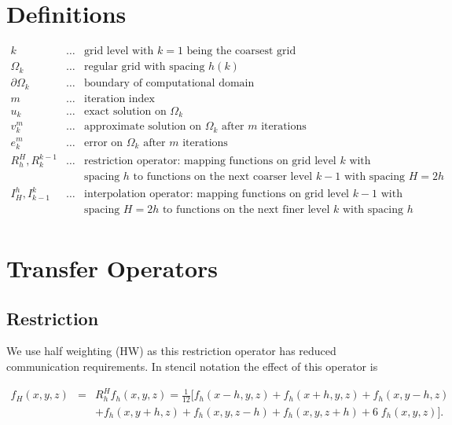 \documentclass[11pt, oneside, a4paper]{article}
\begin{document}
\section{Definitions}

\begin{eqnarray*}
k&\dots&\mbox{grid level with $k=1$ being the coarsest grid}\\
\Omega_k &\dots& \mbox{regular grid with spacing $h(k)$}\\
\partial \Omega_k &\dots& \mbox{boundary of computational domain}\\
m&\dots& \mbox{iteration index}\\
u_k&\dots& \mbox{exact solution on $\Omega_k$}\\ 
v_k^m&\dots& \mbox{approximate solution on $\Omega_k$ after $m$ iterations}\\
e_k^m&\dots& \mbox{error on $\Omega_k$ after $m$ iterations}\\ 
R_h^H, R_k^{k-1}&\dots& \mbox{restriction operator: mapping functions on grid level $k$ with} \\
&& \mbox{spacing $h$ to functions on the next coarser level $k-1$ with spacing $H=2h$}\\ 
I_H^h, I_{k-1}^k&\dots& \mbox{interpolation operator: mapping functions on grid level $k-1$ with }\\
&&\mbox{spacing $H=2h$ to functions on the next finer level $k$ with spacing $h$}\\ 
\end{eqnarray*}


\section{Transfer Operators}

\subsection{Restriction}

We use half weighting (HW) as this restriction operator has reduced communication requirements. In stencil notation the effect of this operator is

\begin{eqnarray*}
f_H(x,y,z) &=& R_h^H f_h(x,y,z) = \frac{1}{12}[ f_h(x-h,y,z)+f_h(x+h,y,z)+f_h(x,y-h,z)\\
&& +f_h(x,y+h,z)+f_h(x,y,z-h)+f_h(x,y,z+h)+6\;f_h(x,y,z)].
\end{eqnarray*}
\end{document}
